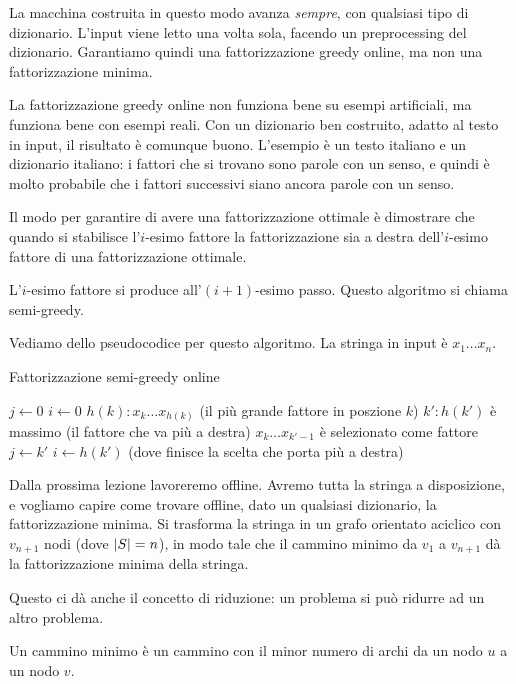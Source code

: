 La macchina costruita in questo modo avanza \emph{sempre}, con qualsiasi tipo di dizionario. L'input viene letto una volta sola, facendo un preprocessing del dizionario. Garantiamo quindi una fattorizzazione greedy online, ma non una fattorizzazione minima.

La fattorizzazione greedy online non funziona bene su esempi artificiali, ma funziona bene con esempi reali. Con un dizionario ben costruito, adatto al testo in input, il risultato \`e comunque buono. L'esempio \`e un testo italiano e un dizionario italiano: i fattori che si trovano sono parole con un senso, e quindi \`e molto probabile che i fattori successivi siano ancora parole con un senso.

Il modo per garantire di avere una fattorizzazione ottimale \`e dimostrare che quando si stabilisce l'$i$-esimo fattore la fattorizzazione sia a destra dell'$i$-esimo fattore di una fattorizzazione ottimale.

L'$i$-esimo fattore si produce all'$(i + 1)$-esimo passo. Questo algoritmo si chiama semi-greedy.

Vediamo dello pseudocodice per questo algoritmo. La stringa in input \`e $x_1 \ldots x_n$.

\begin{algorithm}
\caption{Fattorizzazione semi-greedy online}
\begin{algorithmic}
\State $j \gets 0$
\State $i \gets 0$
\Repeat
        \State $h(k) : x_k \ldots x_{h(k)}$ (il pi\`u grande fattore in poszione $k$)
        \State $k' : h(k')$ \`e massimo (il fattore che va pi\`u a destra)
    \EndFor
    \State $x_k \ldots x_{k' - 1}$ \`e selezionato come fattore
    \State $j \gets k'$
    \State $i \gets h(k')$ (dove finisce la scelta che porta pi\`u a destra)
\end{algorithmic}
\end{algorithm}

Dalla prossima lezione lavoreremo offline. Avremo tutta la stringa a disposizione, e vogliamo capire come trovare offline, dato un qualsiasi dizionario, la fattorizzazione minima. Si trasforma la stringa in un grafo orientato aciclico con $v_{n+1}$ nodi (dove $\left\lvert{S}\right\rvert = n$), in modo tale che il cammino minimo da $v_{1}$ a $v_{n+1}$ d\`a la fattorizzazione minima della stringa.

Questo ci d\`a anche il concetto di riduzione: un problema si pu\`o ridurre ad un altro problema.

\begin{defn}
Un cammino minimo \`e un cammino con il minor numero di archi da un nodo $u$ a un nodo $v$.
\end{defn}

